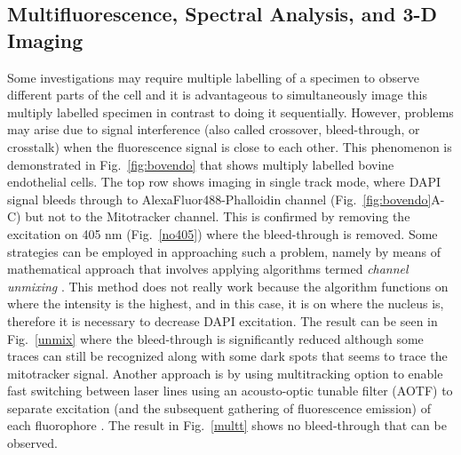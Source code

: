 \subsection{Multifluorescence, Spectral Analysis, and 3-D Imaging}

Some investigations may require multiple labelling of a specimen to observe different parts of the cell and it is advantageous to simultaneously image this multiply labelled specimen in contrast to doing it sequentially. 
However, problems may arise due to signal interference (also called crossover, bleed-through, or crosstalk) when the fluorescence signal is close to each other. 
This phenomenon is demonstrated in Fig.~\ref{fig:bovendo} that shows multiply labelled bovine endothelial cells. 
The top row shows imaging in single track mode, where DAPI signal bleeds through to AlexaFluor488-Phalloidin channel (Fig.~\ref{fig:bovendo}A-C) but not to the Mitotracker channel. 
This is confirmed by removing the excitation on 405 nm (Fig.~\ref{no405}) where the bleed-through is removed. 
Some strategies can be employed in approaching such a problem, namely by means of mathematical approach that involves applying algorithms termed \textit{channel unmixing} \cite{NikonMicro}\cite{Lect11}. 
This method does not really work because the algorithm functions on where the intensity is the highest, and in this case, it is on where the nucleus is, therefore it is necessary to decrease DAPI excitation. 
The result can be seen in Fig.~\ref{unmix} where the bleed-through is significantly reduced although some traces can still be recognized along with some dark spots that seems to trace the mitotracker signal. 
Another approach is by using multitracking option to enable fast switching between laser lines using an acousto-optic tunable filter (AOTF) to separate excitation (and the subsequent gathering of fluorescence emission) of each fluorophore \cite{ZeissCamp3}. 
The result in Fig.~\ref{multt} shows no bleed-through that can be observed.

